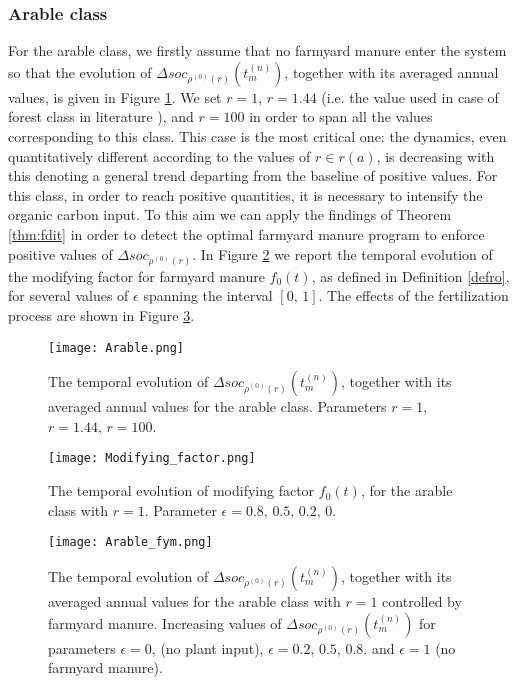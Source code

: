 \subsubsection{Arable class}
For the arable class, we firstly assume that no farmyard manure enter the system so that the evolution of $\Delta soc_{\rho^{(0)}(r)}(t^{(n)}_{m})$, together with its averaged annual values, is given in Figure \ref{fig:arable}. We set $r= 1$, $r=1.44$ (i.e. the value used in case of forest class in literature \cite{coleman1996rothc}), and $r=100$ in order to span all the values corresponding to this class.  This case  is the most critical one: the dynamics, even quantitatively different according to the values of $r\in r(a)$, is decreasing with this denoting a general trend departing from the baseline of positive values. For this class, in order to reach positive quantities, it is necessary to intensify the organic carbon input. %
To this aim we can apply the findings of  Theorem \ref{thm:fdit} in order to detect the optimal farmyard manure program  to enforce positive values of $\Delta soc_{\rho^{(0)}(r)}$. In  Figure \ref{fig:modifying} we report the temporal evolution of the modifying factor for farmyard manure $f_0(t)$, as defined in Definition \ref{defro}, for several values of $\epsilon$ spanning the interval $[0,\, 1]$. 
The effects of the fertilization process are shown in Figure \ref{fig:arable_controlled}.
\begin{figure}[h!] 
\begin{center} 
  \texttt{[image: Arable.png]}
  \end{center}
  \caption{The temporal evolution of $\Delta soc_{\rho^{(0)}(r)}(t^{(n)}_{m})$, together with its averaged annual values for the arable class. Parameters $r=1$, $r=1.44$, $r=100$. }\label{fig:arable}
\end{figure}
\begin{figure}[h!] 
\begin{center} 
  \texttt{[image: Modifying\_factor.png]}
  \end{center}
  \caption{The temporal evolution of modifying factor $f_0(t)$, for the arable class with $r=1$. Parameter $\epsilon=0.8,\, 0.5,\, 0.2,\, 0.$ }\label{fig:modifying}
\end{figure}

\begin{figure}[h!] 
\begin{center} 
  \texttt{[image: Arable\_fym.png]}
  \end{center}
  \caption{The temporal evolution of $\Delta soc_{\rho^{(0)}(r)}(t^{(n)}_{m})$, together with its averaged annual values for the arable class with $r=1$ controlled by farmyard manure. Increasing values of $\Delta soc_{\rho^{(0)}(r)}(t^{(n)}_{m})$ for parameters $\epsilon= 0$, (no plant input), $\epsilon=  0.2,\, 0.5,\, 0.8$.  and $ \epsilon=1$ (no farmyard manure). }\label{fig:arable_controlled}
\end{figure}

